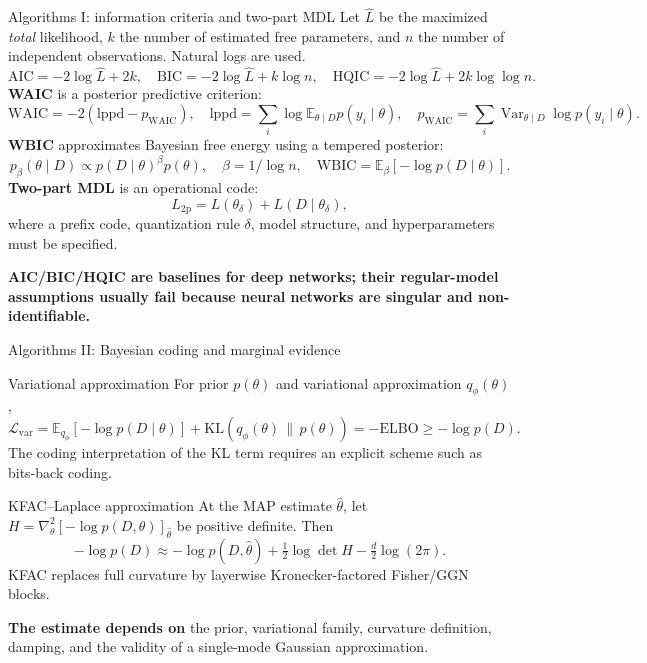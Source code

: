 \documentclass[aspectratio=169,notheorems]{beamer}
\newcommand{\E}{\mathbb{E}}
\newcommand{\KL}{\mathrm{KL}}
\newcommand{\take}[1]{%
  \par\vspace{0.35em}{\color{myblue}\hrule height 0.6pt}%
  \vspace{0.25em}\noindent\textbf{#1}\par}
\begin{document}
\begin{frame}[shrink=9]{Algorithms I: information criteria and two-part MDL}
\footnotesize
Let $\widehat L$ be the maximized \emph{total} likelihood, $k$ the number of estimated
free parameters, and $n$ the number of independent observations. Natural logs are used.
\[
\mathrm{AIC}=-2\log\widehat L+2k,\quad
\mathrm{BIC}=-2\log\widehat L+k\log n,\quad
\mathrm{HQIC}=-2\log\widehat L+2k\log\log n.
\]
\textbf{WAIC} is a posterior predictive criterion:
\[
\mathrm{WAIC}=-2(\mathrm{lppd}-p_{\mathrm{WAIC}}),\quad
\mathrm{lppd}=\sum_i\log\E_{\theta\mid D}p(y_i\mid\theta),\quad
p_{\mathrm{WAIC}}=\sum_i\operatorname{Var}_{\theta\mid D}\log p(y_i\mid\theta).
\]
\textbf{WBIC} approximates Bayesian free energy using a tempered posterior:
\[
p_\beta(\theta\mid D)\propto p(D\mid\theta)^\beta p(\theta),\quad
\beta=1/\log n,\quad
\mathrm{WBIC}=\E_\beta[-\log p(D\mid\theta)].
\]
\textbf{Two-part MDL} is an operational code:
\[
L_{\mathrm{2p}}=L(\theta_\delta)+L(D\mid\theta_\delta),
\]
where a prefix code, quantization rule $\delta$, model structure, and hyperparameters
must be specified.

\take{AIC/BIC/HQIC are baselines for deep networks; their regular-model assumptions
usually fail because neural networks are singular and non-identifiable.}
\end{frame}

\begin{frame}[shrink=5]{Algorithms II: Bayesian coding and marginal evidence}
\small
\begin{block}{Variational approximation}
For prior $p(\theta)$ and variational approximation $q_\phi(\theta)$,
\[
\mathcal L_{\mathrm{var}}
=\E_{q_\phi}[-\log p(D\mid\theta)]
+\KL\!\left(q_\phi(\theta)\,\|\,p(\theta)\right)
=-\mathrm{ELBO}\geq-\log p(D).
\]
The coding interpretation of the KL term requires an explicit scheme such as bits-back coding.
\end{block}

\begin{block}{KFAC--Laplace approximation}
At the MAP estimate $\widehat\theta$, let
$H=\nabla_\theta^2[-\log p(D,\theta)]_{\widehat\theta}$ be positive definite. Then
\[
-\log p(D)\approx-\log p(D,\widehat\theta)
+\tfrac12\log\det H-\tfrac d2\log(2\pi).
\]
KFAC replaces full curvature by layerwise Kronecker-factored Fisher/GGN blocks.
\end{block}

\textbf{The estimate depends on} the prior, variational family, curvature definition,
damping, and the validity of a single-mode Gaussian approximation.
\end{frame}
\end{document}

